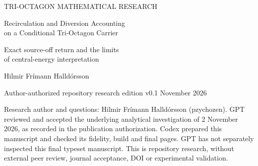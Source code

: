 \documentclass[11pt,a4paper]{article}
\numberwithin{equation}{section}
\theoremstyle{remark}\newtheorem{remark}[theorem]{Remark}
\begin{document}
\hypersetup{pageanchor=false}
\begin{titlepage}
\vspace*{6mm}
{\small\color{MidnightBlue} TRI-OCTAGON MATHEMATICAL RESEARCH\par}
\vspace{8mm}
{\LARGE\bfseries\raggedright Recirculation and Diversion Accounting\\
on a Conditional Tri-Octagon Carrier\par}
\vspace{6mm}
{\large Exact source-off return and the limits\\ of central-energy interpretation\par}
\vspace{7mm}
{\large Hilmir Fr\'imann Halld\'orsson\par}
\vspace{3mm}
{Author-authorized repository research edition v0.1 November 2026\par}
\vspace{5mm}
\begin{abstract}
A separately adopted periodic one-dimensional carrier associated with the Tri-Octagon model admits exact source-off recirculation. Its normalized characteristic profiles travel in opposite directions, preserve their separate quadratic storage, and return to the same periodic coordinates after one circuit time. At a fixed section, one full source-off circuit carries each directional storage past the cut once. Gross throughput equals total storage, while net throughput is the difference of the directional stocks; repeated circuits recount circulating storage. Complementary-arc balances distinguish local departure from total loss, and a same-drive preparation comparison retains the signed nature of source work. We then separate a hypothetical diverted share from a finite-window return deficit: the same shortfall is compatible with diversion or temporary route storage. An unloaded exterior observation adds no supplying-energy debit. These results establish conditional carrier accounting, not an energetic transfer from or return to the native center. Central-route registration, receiving states and reciprocal native exchange remain unassigned, and no numerical diversion fraction is inferred.
\end{abstract}
\vfill
{\small Research author and questions: Hilmir Fr\'imann Halld\'orsson (pzychozen).
GPT reviewed and accepted the underlying analytical investigation of 2 November 2026, as recorded in the publication authorization.
Codex prepared this manuscript and checked its fidelity, build and final pages.
GPT has not separately inspected this final typeset manuscript.
This is repository research, without external peer review, journal acceptance, DOI or experimental validation.}
\end{titlepage}
\setcounter{page}{2}\hypersetup{pageanchor=true}







\end{document}
